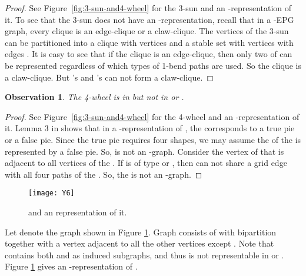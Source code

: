 \documentclass[11pt,3p,times]{elsarticle}
\newenvironment{myproof}{\begin{proof}}{\end{proof}}
\newtheorem{observation}[theorem]{Observation}
\begin{document}
\begin{myproof}
See Figure~\ref{fig:3-sun-and4-wheel} for the 3-sun and an
-representation of it. To see that the 3-sun
does not have an -representation, recall that in a
-EPG graph, every clique is an edge-clique or a claw-clique.
The vertices of the 3-sun can be partitioned into a clique with
vertices  and a stable set with vertices  with edges
.  It is easy to see that if the clique
 is an edge-clique, then only two of  can be
represented regardless of which types of 1-bend paths are used. So
the clique  is a claw-clique. But 's and 's
can not form a claw-clique.
\end{myproof}
\begin{observation}\label{obs:4-wheel}
The 4-wheel is in  but not in  or
.
\end{observation}
\begin{myproof}
See Figure~\ref{fig:3-sun-and4-wheel} for the 4-wheel  and an
-representation of it. Lemma 3 in
\cite{Asi2012} shows that in a -representation of , the
 corresponds to a true pie or a false pie. Since the true pie
requires four shapes, we may assume the  of the  is
represented by a false pie. So,  is not an -graph.
Consider the vertex  of  that is adjacent to all vertices
of the . If  is of type  or , then  can
not share a grid edge with all four paths of the . So, the
 is not an -graph.
\end{myproof}

\begin{figure}[bth]
\centering
\texttt{[image: Y6]}
\caption{ and an  representation of it.}
\label{fig:Y6}
\end{figure}


Let  denote the graph shown in Figure
\ref{fig:Y6}.
Graph  consists of  with bipartition 
together with a vertex  adjacent to all the other vertices except . Note
that  contains both  and  as induced subgraphs, and thus is
not representable in  or . Figure
\ref{fig:Y6}
gives an -representation of .
\end{document}
